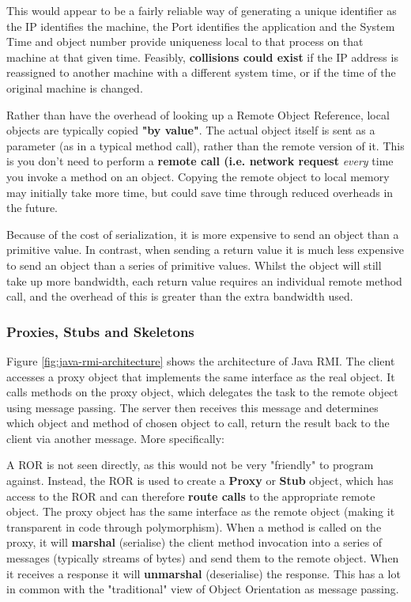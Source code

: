 \documentclass{article}
\begin{document}
This would appear to be a fairly reliable way of generating a unique identifier as the IP identifies the machine, the Port identifies the application and the System Time and object number provide uniqueness local to that process on that machine at that given time. Feasibly, \textbf{collisions could exist} if the IP address is reassigned to another machine with a different system time, or if the time of the original machine is changed. 

Rather than have the overhead of looking up a Remote Object Reference, local objects are typically copied \textbf{"by value"}. The actual object itself is sent as a parameter (as in a typical method call), rather than the remote version of it. This is you don't need to perform a \textbf{remote call (i.e. network request} \textit{every} time you invoke a method on an object. Copying the remote object to local memory may initially take more time, but could save time through reduced overheads in the future.

Because of the cost of serialization, it is more expensive to send an object than a primitive value. In contrast, when sending a return value it is much less expensive to send an object than a series of primitive values. Whilst the object will still take up more bandwidth, each return value requires an individual remote method call, and the overhead of this is greater than the extra bandwidth used.

\subsubsection{Proxies, Stubs and Skeletons}

Figure \ref{fig:java-rmi-architecture} shows the architecture of Java RMI. The client accesses a proxy object that implements the same interface as the real object. It calls methods on the proxy object, which delegates the task to the remote object using message passing. The server then receives this message and determines which object and method of chosen object to call, return the result back to the client via another message. More specifically:

A ROR is not seen directly, as this would not be very "friendly" to program against. Instead, the ROR is used to create a \textbf{Proxy} or \textbf{Stub} object, which has access to the ROR and can therefore \textbf{route calls} to the appropriate remote object. The proxy object has the same interface as the remote object (making it transparent in code through polymorphism). When a method is called on the proxy, it will \textbf{marshal} (serialise) the client method invocation into a series of messages (typically streams of bytes) and send them to the remote object. When it receives a response it will \textbf{unmarshal} (deserialise) the response. This has a lot in common with the "traditional" view of Object Orientation as message passing.
\end{document}
